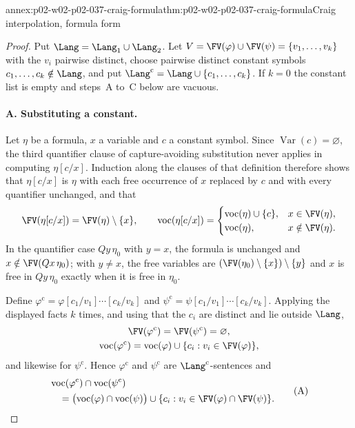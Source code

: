 \begin{annexitem}{annex:p02-w02-p02-037-craig-formula}{thm:p02-w02-p02-037-craig-formula}{Craig interpolation, formula form}
\begin{proof}
Put \(\Lang=\Lang_1\cup\Lang_2\).  Let
\(V=\FV(\varphi)\cup\FV(\psi)=\{v_1,\ldots,v_k\}\) with the \(v_i\)
pairwise distinct, choose pairwise distinct constant symbols
\(c_1,\ldots,c_k\notin\Lang\), and put
\(\Lang^{\mathrm{c}}=\Lang\cup\{c_1,\ldots,c_k\}\).  If \(k=0\) the constant list is
empty and steps~A to~C below are vacuous.

\paragraph{A. Substituting a constant.}
Let \(\eta\) be a formula, \(x\) a variable and \(c\) a constant symbol.
Since \(\operatorname{Var}(c)=\varnothing\), the third quantifier clause of
capture-avoiding substitution never applies in computing \(\eta[c/x]\).
Induction along the clauses of that definition therefore shows that
\(\eta[c/x]\) is \(\eta\) with each free occurrence of \(x\) replaced by
\(c\) and with every quantifier unchanged, and that
\[
 \FV(\eta[c/x])=\FV(\eta)\setminus\{x\},
 \qquad
 \operatorname{voc}(\eta[c/x])=
 \begin{cases}
  \operatorname{voc}(\eta)\cup\{c\}, & x\in\FV(\eta),\\
  \operatorname{voc}(\eta), & x\notin\FV(\eta).
 \end{cases}
\]
In the quantifier case \(Qy\,\eta_0\) with \(y=x\), the formula is unchanged
and \(x\notin\FV(Qx\,\eta_0)\); with \(y\neq x\), the free variables are
\((\FV(\eta_0)\setminus\{x\})\setminus\{y\}\) and \(x\) is free in
\(Qy\,\eta_0\) exactly when it is free in \(\eta_0\).

Define
\(\varphi^{\mathrm{c}}=\varphi[c_1/v_1]\cdots[c_k/v_k]\) and
\(\psi^{\mathrm{c}}=\psi[c_1/v_1]\cdots[c_k/v_k]\).  Applying the displayed facts
\(k\) times, and using that the \(c_i\) are distinct and lie outside
\(\Lang\),
\[
\begin{gathered}
 \FV(\varphi^{\mathrm{c}})=\FV(\psi^{\mathrm{c}})=\varnothing,\\
 \operatorname{voc}(\varphi^{\mathrm{c}})=
   \operatorname{voc}(\varphi)\cup\{c_i:v_i\in\FV(\varphi)\},
\end{gathered}
\]
and likewise for \(\psi^{\mathrm{c}}\).  Hence \(\varphi^{\mathrm{c}}\) and
\(\psi^{\mathrm{c}}\) are \(\Lang^{\mathrm{c}}\)-sentences and
\[
\begin{aligned}
 &\operatorname{voc}(\varphi^{\mathrm{c}})\cap\operatorname{voc}(\psi^{\mathrm{c}})\\
 &\quad=\bigl(\operatorname{voc}(\varphi)\cap\operatorname{voc}(\psi)\bigr)
  \cup\{c_i:v_i\in\FV(\varphi)\cap\FV(\psi)\}.
\end{aligned}
 \tag{A}
\]


\end{proof}
\end{annexitem}
